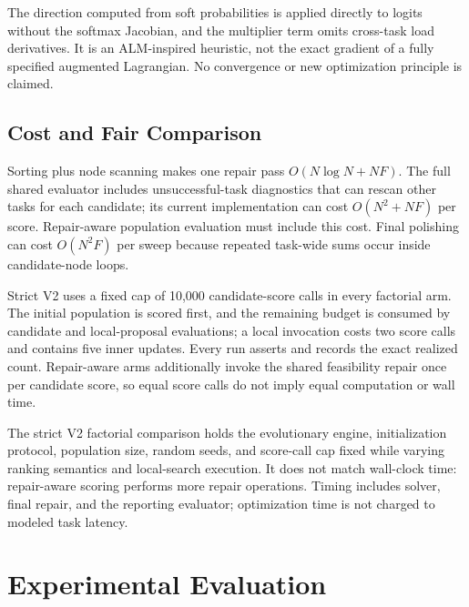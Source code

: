 \documentclass[pdflatex,sn-mathphys-num]{sn-jnl}
\begin{document}
The direction computed from soft probabilities is applied directly to logits without the softmax Jacobian, and the multiplier term omits cross-task load derivatives. It is an ALM-inspired heuristic, not the exact gradient of a fully specified augmented Lagrangian. No convergence or new optimization principle is claimed.

\subsection{Cost and Fair Comparison}
Sorting plus node scanning makes one repair pass $O(N\log N+NF)$. The full shared evaluator includes unsuccessful-task diagnostics that can rescan other tasks for each candidate; its current implementation can cost $O(N^2+NF)$ per score. Repair-aware population evaluation must include this cost. Final polishing can cost $O(N^2F)$ per sweep because repeated task-wide sums occur inside candidate-node loops.

Strict V2 uses a fixed cap of 10,000 candidate-score calls in every factorial arm. The initial population is scored first, and the remaining budget is consumed by candidate and local-proposal evaluations; a local invocation costs two score calls and contains five inner updates. Every run asserts and records the exact realized count. Repair-aware arms additionally invoke the shared feasibility repair once per candidate score, so equal score calls do not imply equal computation or wall time.

The strict V2 factorial comparison holds the evolutionary engine, initialization protocol, population size, random seeds, and score-call cap fixed while varying ranking semantics and local-search execution. It does not match wall-clock time: repair-aware scoring performs more repair operations. Timing includes solver, final repair, and the reporting evaluator; optimization time is not charged to modeled task latency.



\section{Experimental Evaluation}
\end{document}
